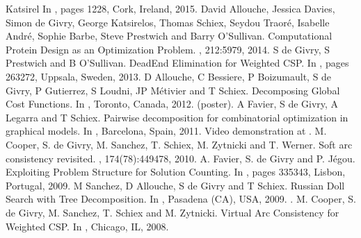 \documentclass[letterpaper,10pt,openany,oneside,english]{sphinxmanual}
\begin{document}
\begin{sphinxthebibliography}{Katsirel}
In , pages 12\sphinxhyphen{}28, Cork, Ireland, 2015.
\sphinxAtStartPar
David Allouche, Jessica Davies, Simon de Givry, George Katsirelos, Thomas Schiex, Seydou Traoré, Isabelle André, Sophie Barbe, Steve Prestwich and Barry O’Sullivan.
Computational Protein Design as an Optimization Problem.
, 212:59\sphinxhyphen{}79, 2014.
\sphinxAtStartPar
S de Givry, S Prestwich and B O’Sullivan.
Dead\sphinxhyphen{}End Elimination for Weighted CSP.
In , pages 263\sphinxhyphen{}272, Uppsala, Sweden, 2013.
\sphinxAtStartPar
D Allouche, C Bessiere, P Boizumault, S de Givry, P Gutierrez, S Loudni, JP Métivier and T Schiex.
Decomposing Global Cost Functions.
In , Toronto, Canada, 2012.
 (poster).
\sphinxAtStartPar
A Favier, S de Givry, A Legarra and T Schiex.
Pairwise decomposition for combinatorial optimization in graphical models.
In , Barcelona, Spain, 2011.
Video demonstration at .
\sphinxAtStartPar
M. Cooper, S. de Givry, M. Sanchez, T. Schiex, M. Zytnicki and T. Werner.
Soft arc consistency revisited.
, 174(7\sphinxhyphen{}8):449\sphinxhyphen{}478, 2010.
\sphinxAtStartPar
A. Favier, S. de Givry and P. Jégou.
Exploiting Problem Structure for Solution Counting.
In , pages 335\sphinxhyphen{}343, Lisbon, Portugal, 2009.
\sphinxAtStartPar
M Sanchez, D Allouche, S de Givry and T Schiex.
Russian Doll Search with Tree Decomposition.
In , Pasadena (CA), USA, 2009.
.
\sphinxAtStartPar
M. Cooper, S. de Givry, M. Sanchez, T. Schiex and M. Zytnicki.
Virtual Arc Consistency for Weighted CSP.
In , Chicago, IL, 2008.
\sphinxAtStartPar

\end{sphinxthebibliography}
\end{document}
